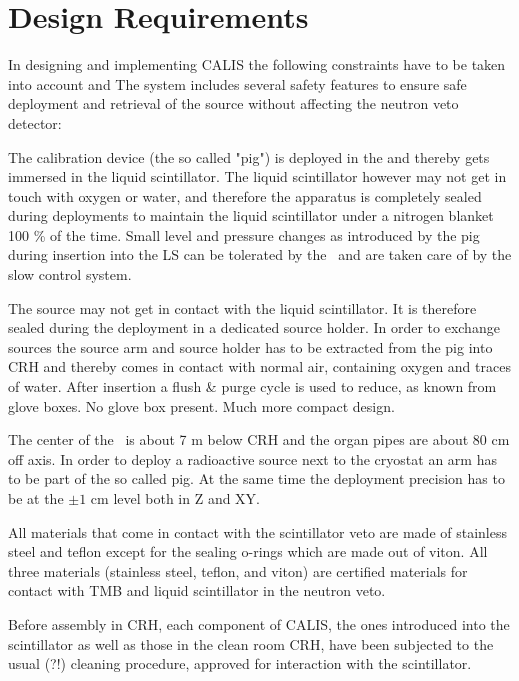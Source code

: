 \section{Design Requirements} \label{sec:hardware}\label{sec:design_requirements}



In designing and implementing CALIS the following constraints have to be taken into account and The system includes several safety features to ensure safe deployment and retrieval of the source without affecting the neutron veto detector:
\begin{description}
\item The calibration device (the so called "pig") is deployed in the \lsv and thereby gets immersed in the liquid scintillator. The liquid scintillator however may not get in touch with oxygen or water, and therefore the apparatus is completely sealed during deployments to maintain the liquid scintillator under a nitrogen blanket 100 \% of the time. Small level and pressure changes as introduced by the pig during insertion into the LS can be tolerated by the \lsv\ and are taken care of by the slow control system.

\item The source may not get in contact with the liquid scintillator. It is therefore sealed during the deployment in a dedicated source holder. In order to exchange sources the source arm and source holder has to be extracted from the pig into CRH and thereby comes in contact with normal air, containing oxygen and traces of water. After insertion a flush \& purge cycle is used to reduce, as known from glove boxes. No glove box present. Much more compact design.



\item The center of the \tpc\ is about 7 m below CRH and the organ pipes are about 80 cm off axis. In order to deploy a radioactive source next to the cryostat an arm has to be part of the so called pig. At the same time the deployment precision has to be at the $\pm 1$ cm level both in Z and XY.
\item[material and cleanliness] 
All materials that come in contact with the scintillator veto are made of stainless steel and teflon except for the sealing o-rings which are made out of viton.  All three materials (stainless steel, teflon, and viton) are certified materials for contact with TMB and liquid scintillator in the neutron veto.

Before assembly in CRH, each component of CALIS, the ones introduced into the scintillator as well as those in the clean room CRH, have been subjected to the usual (?!) cleaning procedure, approved for interaction with the scintillator.

\end{description}

